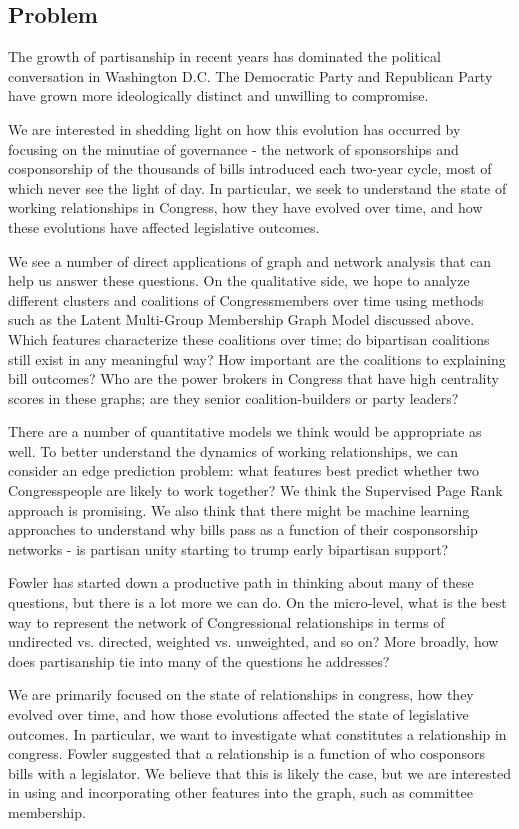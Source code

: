 \subsection{Problem}

The growth of partisanship in recent years has dominated the political conversation in Washington D.C. The Democratic Party and Republican Party have grown more ideologically distinct and unwilling to compromise. 

We are interested in shedding light on how this evolution has occurred by focusing on the minutiae of governance - the network of sponsorships and cosponsorship of the thousands of bills introduced each two-year cycle, most of which never see the light of day. In particular, we seek to understand the state of working relationships in Congress, how they have evolved over time, and how these evolutions have affected legislative outcomes.

We see a number of direct applications of graph and network analysis that can help us answer these questions. On the qualitative side, we hope to analyze different clusters and coalitions of Congressmembers over time using methods such as the Latent Multi-Group Membership Graph Model discussed above. Which features characterize these coalitions over time; do bipartisan coalitions still exist in any meaningful way? How important are the coalitions to explaining bill outcomes? Who are the power brokers in Congress that have high centrality scores in these graphs; are they senior coalition-builders or party leaders?

There are a number of quantitative models we think would be appropriate as well. To better understand the dynamics of working relationships, we can consider an edge prediction problem: what features best predict whether two Congresspeople are likely to work together? We think the Supervised Page Rank approach is promising. We also think that there might be machine learning approaches to understand why bills pass as a function of their cosponsorship networks - is partisan unity starting to trump early bipartisan support?

Fowler has started down a productive path in thinking about many of these questions, but there is a lot more we can do. On the micro-level, what is the best way to represent the network of Congressional relationships in terms of undirected vs. directed, weighted vs. unweighted, and so on? More broadly, how does partisanship tie into many of the questions he addresses?

We are primarily focused on the state of relationships in congress, how 
they evolved over time, and how those evolutions affected the state of 
legislative outcomes. In particular, we want to investigate what constitutes a 
relationship in congress. Fowler suggested that a relationship is a function 
of who cosponsors bills with a legislator. We believe that this is likely the 
case, but we are interested in using and incorporating other features into 
the graph, such as committee membership. 

